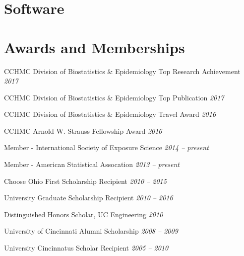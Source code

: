 \documentclass[margin,line]{res}
\newenvironment{list3}{
  \begin{list}{}{%
      \setlength{\itemsep}{0in}
      \setlength{\parsep}{0in} \setlength{\parskip}{0in}
      \setlength{\topsep}{0in} \setlength{\partopsep}{0in}
      \setlength{\leftmargin}{0in}}}{\end{list}}
\begin{document}
\begin{resume}
\section{\sc Software}


\section{\sc Awards and Memberships}

\begin{list3} \itemsep 4pt
\item[] CCHMC Division of Biostatistics \& Epidemiology Top Research Achievement \hfill \textit{2017}
\item[] CCHMC Division of Biostatistics \& Epidemiology Top Publication \hfill \textit{2017}
\item[] CCHMC Division of Biostatistics \& Epidemiology Travel Award \hfill \textit{2016}
\item[] CCHMC Arnold W. Strauss Fellowship Award \hfill \textit{2016}
\item[] Member - International Society of Exposure Science \hfill \textit{2014 -- present}
\item[] Member - American Statistical Assocation \hfill \textit{2013 -- present}
\item[] Choose Ohio First Scholarship Recipient \hfill \textit{2010 -- 2015}
\item[] University Graduate Scholarship Recipient \hfill \textit{2010 -- 2016}
\item[] Distinguished Honors Scholar, UC Engineering \hfill \textit{2010}
\item[] University of Cincinnati Alumni Scholarship \hfill \textit{2008 -- 2009}
\item[] University Cincinnatus Scholar Recipient \hfill \textit{2005 -- 2010}
\end{list3}



\end{resume}
\end{document}
